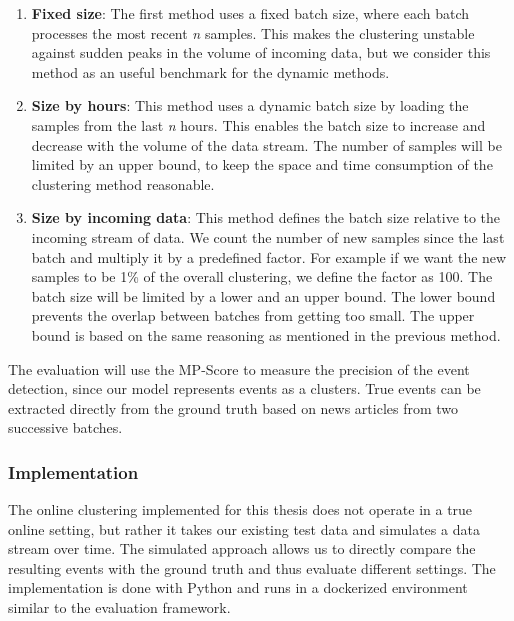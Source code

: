 \begin{enumerate}
    \item \textbf{Fixed size}: The first method uses a fixed batch size,
          where each batch processes the most recent \textit{n} samples.
          This makes the clustering unstable against sudden peaks in the volume of incoming data,
          but we consider this method as an useful benchmark for the dynamic methods.
    \item \textbf{Size by hours}: This method uses a dynamic batch size
          by loading the samples from the last \textit{n} hours.
          This enables the batch size to increase and decrease with the volume of the data stream.
          The number of samples will be limited by an upper bound,
          to keep the space and time consumption of the clustering method reasonable.
    \item \textbf{Size by incoming data}: This method defines the batch size relative to the incoming stream of data.
          We count the number of new samples since the last batch and multiply it by a predefined factor.
          For example if we want the new samples to be 1\%
          of the overall clustering, we define the factor as 100.
          The batch size will be limited by a lower and an upper bound.
          The lower bound prevents the overlap between batches from getting too small.
          The upper bound is based on the same reasoning as mentioned in the previous method.
\end{enumerate}

The evaluation will use the MP-Score to measure the precision of the event detection,
since our model represents events as a clusters.
True events can be extracted directly from the ground truth based on news articles from two successive batches.

\subsubsection{Implementation}
\label{subsubsec:4c_implementation}

The online clustering implemented for this thesis does not operate in a true online setting,
but rather it takes our existing test data and simulates a data stream over time.
The simulated approach allows us to directly compare the resulting events
with the ground truth and thus evaluate different settings.
The implementation is done with Python and runs in a dockerized environment similar to the evaluation framework.

